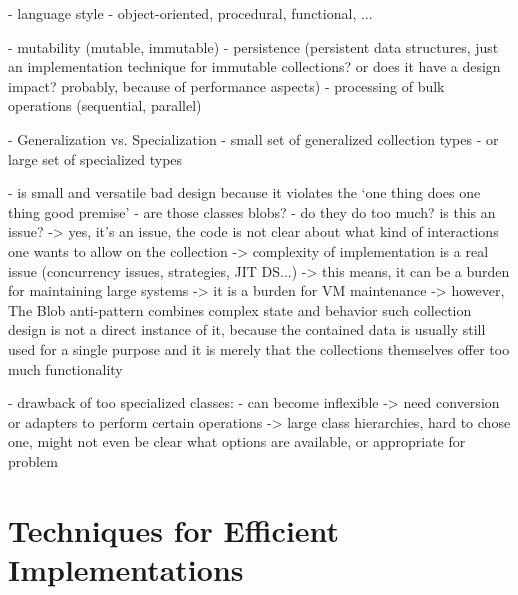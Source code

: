 \documentclass[sigconf, 10pt]{acmart}
\begin{document}
\begin{note}
  - language style
    - object-oriented, procedural, functional, ...
  
  - mutability (mutable, immutable)
  - persistence (persistent data structures, just an implementation technique for immutable collections? or does it have a design impact? probably, because of performance aspects)
  - processing of bulk operations (sequential, parallel)


  - Generalization vs. Specialization  
  - small set of generalized collection types 
  - or large set of specialized types
  
  - is small and versatile bad design because it violates the `one thing does   one thing good premise'
    - are those classes blobs? \citep{brown1998antipatterns}
    - do they do too much? is this an issue?
     -> yes, it's an issue, the code is not clear about what kind of 
        interactions one wants to allow on the collection
     -> complexity of implementation is a real issue (concurrency issues,
        strategies, JIT DS...)
     -> this means, it can be a burden for maintaining large systems
     -> it is a burden for VM maintenance
     -> however, The Blob anti-pattern combines complex state and behavior
        such collection design is not a direct instance of it, because
        the contained data is usually still used for a single purpose and
        it is merely that the collections themselves offer too much
        functionality
        
    - drawback of too specialized classes:
      - can become inflexible
        -> need conversion or adapters to perform certain operations
        -> large class hierarchies, hard to chose one, might not even be
           clear what options are available, or appropriate for problem
     
  
  
\end{note}


\section{Techniques for Efficient Implementations}
\end{document}
